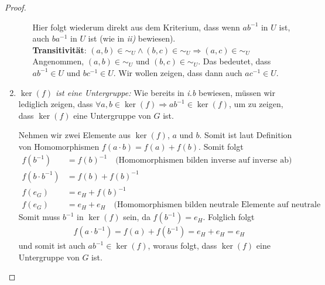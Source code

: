 \documentclass{../problemset}
\begin{document}
\begin{problem}
\begin{proof}
\begin{enumerate}
\begin{enumerate}[label=\alph*)]
			            Hier folgt wiederum direkt aus dem Kriterium, dass wenn $ab^{-1}$ in $U$ ist, auch $ba^{-1}$ in $U$ ist (wie in \textit{ii)} bewiesen). \checkmark \\
			            \textbf{Transitivität}: $(a, b) \in \sim_U \land (b,c) \in \sim_U \Longrightarrow (a,c) \in \sim_U$ \\
			            Angenommen, $(a, b) \in \sim_U$ und $(b, c) \in \sim_U$. Das bedeutet, dass $ab^{-1} \in U$ und $bc^{-1} \in U$. Wir wollen zeigen, dass dann auch $ac^{-1} \in U$.
		      \end{enumerate}
		\item \textit{$\ker(f)$ ist eine Untergruppe:}
		      Wie bereits in \textit{i.b} bewiesen, müssen wir lediglich zeigen, dass $\forall a,b \in \ker(f) \Rightarrow ab^{-1} \in \ker(f)$, um zu zeigen, dass $\ker(f)$ eine Untergruppe von $G$ ist.

		      Nehmen wir zwei Elemente aus $\ker(f)$, $a$ und $b$. Somit ist laut Definition von Homomorphismen $f(a \cdot b) = f(a) + f(b)$. Somit folgt
		      \begin{align}
			      f(b^{-1}) &= f(b)^{-1} \quad \text{(Homomorphismen bilden inverse auf inverse ab)} \\
			      f(b \cdot b^{-1}) &= f(b) + f(b)^{-1} \\
			      f(e_G) &= e_H + f(b)^{-1} \\
			      f(e_G) &= e_H + e_H \quad \text{(Homomorphismen bilden neutrale Elemente auf neutrale Elemente ab)}
		      \end{align}
		      Somit muss $b^{-1}$ in $\ker(f)$ sein, da $f(b^{-1}) = e_H$. Folglich folgt
		      \begin{align}
			      f(a \cdot b^{-1}) = f(a) + f(b^{-1}) = e_H + e_H = e_H
		      \end{align}
		      und somit ist auch $ab^{-1} \in \ker(f)$, woraus folgt, dass $\ker(f)$ eine Untergruppe von $G$ ist.
	\end{enumerate}
\end{proof}
\end{problem}

\pagebreak
\end{document}

